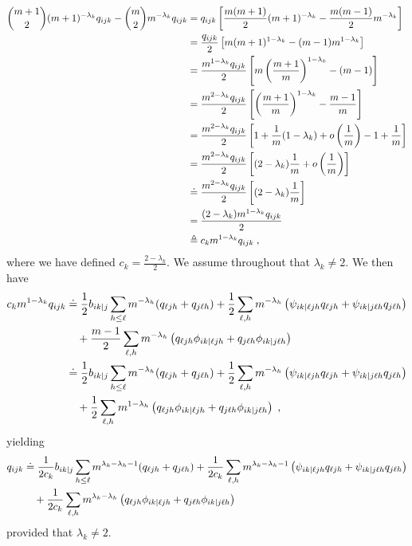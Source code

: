 \begin{align}
    \binom{m+1}{2}(m+1)^{-\lambda_k}q_{ijk} - \binom{m}{2}m^{-\lambda_k}q_{ijk} &= q_{ijk}\left[\frac{m(m+1)}{2}(m+1)^{-\lambda_k} - \frac{m(m-1)}{2}m^{-\lambda_k}\right] \\ 
    &= \frac{q_{ijk}}{2}\left[m(m+1)^{1-\lambda_k} - (m-1)m^{1-\lambda_k}\right] \\ 
    &= \frac{m^{1-\lambda_k} q_{ijk}}{2} \left[m\left(\frac{m+1}{m}\right)^{1-\lambda_k} - (m-1)\right] \\ 
    &= \frac{m^{2-\lambda_k} q_{ijk}}{2} \left[\left(\frac{m+1}{m}\right)^{1-\lambda_k} - \frac{m-1}{m}\right] \\ 
    &= \frac{m^{2-\lambda_k} q_{ijk}}{2} \left[1 + \frac{1}{m}(1-\lambda_k) +  o\left(\frac{1}{m}\right) - 1 + \frac{1}{m}\right] \\ 
    &= \frac{m^{2-\lambda_k} q_{ijk}}{2} \left[(2-\lambda_k)\frac{1}{m} + o\left(\frac{1}{m}\right)\right] \\ 
    &\doteq \frac{m^{2-\lambda_k} q_{ijk}}{2} \left[(2-\lambda_k)\frac{1}{m}\right] \\ 
    &= \frac{(2-\lambda_k)m^{1-\lambda_k} q_{ijk}}{2} \\ 
    &\triangleq c_k m^{1-\lambda_k} q_{ijk}\;,
\end{align}
where we have defined $c_k = \frac{2-\lambda_k}{2}$.
We assume throughout that $\lambda_k \neq 2$.
We then have 
\begin{align}
    c_k m^{1-\lambda_k} q_{ijk} &\doteq \frac{1}{2}b_{ik|j} \sum_{h\leq \ell} m^{-\lambda_h} (q_{\ell jh} + q_{j\ell h}) + \frac{1}{2}\sum_{\ell, h} m^{-\lambda_h}\left(\psi_{ik|\ell j h} q_{\ell jh} + \psi_{ik|j \ell h}q_{j \ell h}\right) \nonumber\\ 
    &\quad + \frac{m-1}{2}\sum_{\ell, h} m^{-\lambda_h} \left(q_{\ell j h} \phi_{ik|\ell jh} + q_{j \ell h} \phi_{ik|j\ell h}\right) \\ 
    &\doteq \frac{1}{2}b_{ik|j} \sum_{h\leq \ell} m^{-\lambda_h} (q_{\ell jh} + q_{j\ell h}) + \frac{1}{2}\sum_{\ell, h} m^{-\lambda_h}\left(\psi_{ik|\ell j h} q_{\ell jh} + \psi_{ik|j \ell h}q_{j \ell h}\right) \nonumber\\ 
    &\quad + \frac{1}{2}\sum_{\ell, h} m^{1-\lambda_h} \left(q_{\ell j h} \phi_{ik|\ell jh} + q_{j \ell h} \phi_{ik|j\ell h}\right)\;,
\end{align}
yielding 
\begin{align}
    q_{ijk} &\doteq \frac{1}{2c_k}b_{ik|j} \sum_{h \leq \ell} m^{\lambda_k-\lambda_h-1} (q_{\ell jh} + q_{j\ell h}) + \frac{1}{2c_k}\sum_{\ell, h} m^{\lambda_k-\lambda_h-1}\left(\psi_{ik|\ell j h} q_{\ell jh} + \psi_{ik|j \ell h}q_{j \ell h}\right) \nonumber\\ 
    &\quad + \frac{1}{2c_k}\sum_{\ell, h} m^{\lambda_k-\lambda_h} \left(q_{\ell j h} \phi_{ik|\ell jh} + q_{j \ell h} \phi_{ik|j\ell h}\right) \label{eq:asymptotics-3}
\end{align}
provided that $\lambda_k \neq 2$. 

